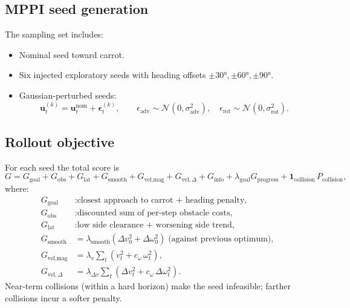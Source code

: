 \documentclass[a4paper, 11pt]{article}
\newcommand{\vect}[1]{\bm{#1}}
\begin{document}
\subsection{MPPI seed generation}

The sampling set includes:
\begin{itemize}
  \item Nominal seed toward carrot.
  \item Six injected exploratory seeds with heading offsets
        $\pm 30°, \pm 60°, \pm 90°$.
  \item Gaussian-perturbed seeds:
    \begin{equation}
      \vect{u}_t^{(k)} = \vect{u}_t^{\text{nom}} + \vect{\epsilon}_t^{(k)},
      \qquad
      \epsilon_{\text{adv}} \sim \mathcal{N}(0, \sigma_{\text{adv}}^2),
      \quad
      \epsilon_{\text{rot}} \sim \mathcal{N}(0, \sigma_{\text{rot}}^2).
    \end{equation}
\end{itemize}

\subsection{Rollout objective}

For each seed the total score is
\begin{equation}\label{eq:rollout-score}
  G = G_{\text{goal}} + G_{\text{obs}} + G_{\text{lat}}
    + G_{\text{smooth}} + G_{\text{vel,mag}} + G_{\text{vel},\Delta}
    + G_{\text{info}}
    + \lambda_{\text{goal}} G_{\text{progress}}
    + \mathbf{1}_{\text{collision}}\,P_{\text{collision}},
\end{equation}
where:
\begin{align}
  G_{\text{goal}}
    &: \text{closest approach to carrot + heading penalty,} \\
  G_{\text{obs}}
    &: \text{discounted sum of per-step obstacle costs,} \\
  G_{\text{lat}}
    &: \text{low side clearance + worsening side trend,} \\
  G_{\text{smooth}}
    &= \lambda_{\text{smooth}}
       (\Delta v_0^2 + \Delta\omega_0^2)
       \;\text{(against previous optimum),} \\
  G_{\text{vel,mag}}
    &= \lambda_v \sum_t (v_t^2 + c_\omega\,\omega_t^2), \\
  G_{\text{vel},\Delta}
    &= \lambda_{\Delta v}
       \sum_t (\Delta v_t^2 + c_\omega\,\Delta\omega_t^2).
\end{align}
Near-term collisions (within a hard horizon) make the seed infeasible;
farther collisions incur a softer penalty.
\end{document}
